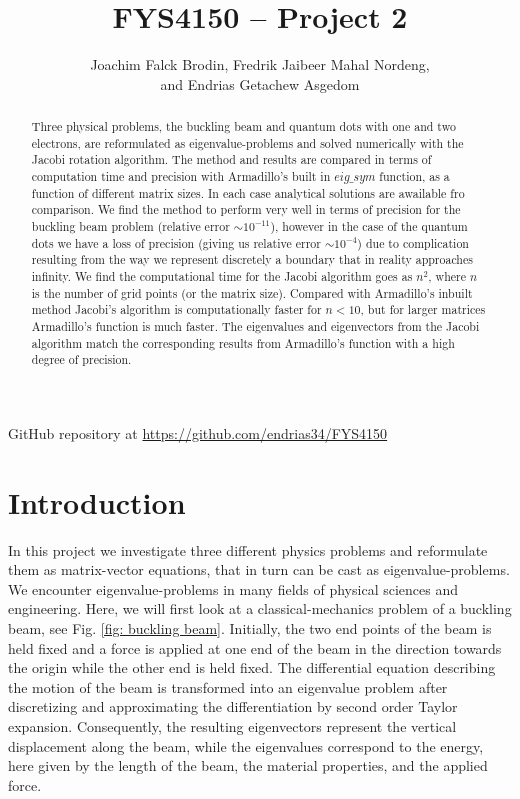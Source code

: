 \documentclass[a4paper]{article}
\begin{document}
\title{FYS4150 -- Project 2}
\author{Joachim Falck Brodin,
        Fredrik Jaibeer Mahal Nordeng,\\ 
        and Endrias Getachew Asgedom}

\maketitle
\begin{abstract}
\noindent
Three physical problems, the buckling beam and quantum dots with one and two electrons, are reformulated as eigenvalue-problems and solved numerically with the Jacobi rotation algorithm. The method and results are compared in terms of computation time and precision with Armadillo's built in $eig\_sym$ function, as a function of different matrix sizes. In each case analytical solutions are awailable fro comparison. We find the method to perform very well in terms of precision for the buckling beam problem (relative error $\sim10^{-11}$), however in the case of the quantum dots we have a loss of precision (giving us relative error $\sim10^{-4}$) due to complication resulting from the way we represent discretely a boundary that in reality approaches infinity. We find the computational time for the Jacobi algorithm goes as $n^2$, where $n$ is the number of grid points (or the matrix size). Compared with Armadillo's inbuilt method Jacobi's algorithm is computationally faster for $n<10$, but for larger matrices Armadillo's function is much faster. The eigenvalues and eigenvectors from the Jacobi algorithm match the corresponding results from Armadillo's function with a high degree of precision. 
\end{abstract}


\newpage
\tableofcontents

\begin{center}
    GitHub repository at \url{https://github.com/endrias34/FYS4150}
\end{center}
\newcommand{\half}{\frac{1}{2}}
\newcommand{\dx}{{\Delta x}}
\newcommand{\bigO}{{\mathcal{O}}}

\newpage

\section{Introduction}
In this project we investigate three different physics problems and reformulate them as matrix-vector equations, that in turn can be cast as eigenvalue-problems. We encounter eigenvalue-problems in many fields of physical sciences and engineering. Here, we will first look at a classical-mechanics problem of a buckling beam, see Fig. \ref{fig: buckling beam}. Initially, the two end points of the beam is held fixed and a force is applied at one end of the beam in the direction towards the origin while the other end is held fixed. The differential equation describing the motion of the beam is transformed into an eigenvalue problem after discretizing and approximating the differentiation by second order Taylor expansion. Consequently, the resulting eigenvectors represent the vertical displacement along the beam, while the eigenvalues correspond to the energy, here given by the length of the beam, the material properties, and the applied force.
\end{document}
